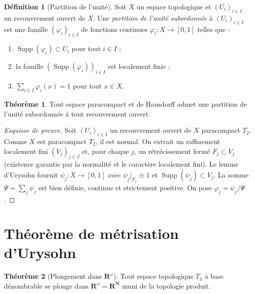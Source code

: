 \documentclass[12pt,a4paper,openany]{book}
\theoremstyle{definition}
\newtheorem{definition}{Définition}[chapter]
\theoremstyle{cours}
\newtheorem{theoreme}{Théorème}[chapter]
\theoremstyle{coursnormal}
\begin{document}
\begin{definition}[Partition de l'unité]
\label{def:partition-unite}
Soit $X$ un espace topologique et $(U_i)_{i\in I}$ un recouvrement
ouvert de $X$. Une \emph{partition de l'unité subordonnée} à
$(U_i)_{i\in I}$ est une famille $(\varphi_i)_{i\in I}$ de fonctions
continues $\varphi_i\colon X\to[0,1]$ telles que :
\begin{enumerate}[label=(\roman*)]
  \item $\operatorname{Supp}(\varphi_i)\subset U_i$ pour tout $i\in I$ ;
  \item la famille $(\operatorname{Supp}(\varphi_i))_{i\in I}$ est
    localement finie ;
  \item $\sum_{i\in I}\varphi_i(x)=1$ pour tout $x\in X$.
\end{enumerate}
\end{definition}

\begin{theoreme}
\label{thm:partition-unite-paracompact}
Tout espace paracompact
et de Hausdorff admet une partition de l'unité subordonnée à tout
recouvrement ouvert.
\end{theoreme}

\begin{proof}[Esquisse de preuve]
Soit $(U_i)_{i\in I}$ un recouvrement ouvert de $X$ paracompact $T_2$.
Comme $X$ est paracompact $T_2$, il est normal. On extrait un
raffinement localement fini $(V_j)_{j\in J}$ et, pour chaque $j$,
un rétrécissement fermé $F_j\subset V_j$ (existence garantie par
la normalité et le caractère localement fini). Le lemme d'Urysohn
fournit $\psi_j\colon X\to[0,1]$ avec $\psi_j|_{F_j}\equiv 1$
et $\operatorname{Supp}(\psi_j)\subset V_j$. La somme
$\Psi=\sum_j\psi_j$ est bien définie, continue et strictement positive.
On pose $\varphi_j=\psi_j/\Psi$.
\end{proof}

\section{Théorème de métrisation d'Urysohn}
\label{sec:metrisation-urysohn}

\begin{theoreme}[Plongement dans $\mathbf{R}^\omega$]
\label{thm:plongement-Rw}
Tout espace topologique $T_3$ à base dénombrable
se plonge dans $\mathbf{R}^\omega=\mathbf{R}^{\mathbf{N}}$ muni de la
topologie produit.
\end{theoreme}
\end{document}
